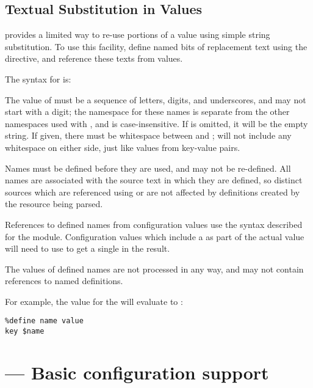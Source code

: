 \documentclass{howto}
\begin{document}
\subsection{Textual Substitution in Values}

 provides a limited way to re-use portions of a value
using simple string substitution.  To use this facility, define named
bits of replacement text using the  directive, and
reference these texts from values.

The syntax for  is:

\begin{alltt}
%define \var{name} \optional{\var{value}}
\end{alltt}

The value of  must be a sequence of letters, digits, and
underscores, and may not start with a digit; the namespace for these
names is separate from the other namespaces used with
, and is case-insensitive.  If  is
omitted, it will be the empty string.  If given, there must be
whitespace between  and ;  will not
include any whitespace on either side, just like values from key-value
pairs.

Names must be defined before they are used, and may not be
re-defined.  All names are associated with the source text in which
they are defined, so distinct sources which are referenced using
 or  are not affected by
definitions created by the resource being parsed.

References to defined names from configuration values use the syntax
described for the  module.
Configuration values which include a \character{\$} as part of the
actual value will need to use \code{\$\$} to get a single
\character{\$} in the result.

The values of defined names are not processed in any way, and may not
contain references to named definitions.

For example, the value for the  will evaluate to
:

\begin{verbatim}
%define name value
key $name
\end{verbatim} %


\section{ --- Basic configuration support}
\end{document}
